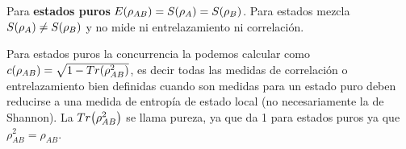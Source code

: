 Para \textbf{estados puros} $E\PARENTESIS{\rho_{AB}}=S\PARENTESIS{\rho_{A}}=S\PARENTESIS{\rho_{B}}$.
Para estados mezcla $S\PARENTESIS{\rho_{A}}\neq S\PARENTESIS{\rho_{B}}$
y no mide ni entrelazamiento ni correlación. 

Para estados puros la concurrencia la podemos calcular como $c\PARENTESIS{\rho_{AB}}=\sqrt{1-Tr\PARENTESIS{\rho_{AB}^{2}}}$,
es decir todas las medidas de correlación o entrelazamiento bien definidas
cuando son medidas para un estado puro deben reducirse a una medida
de entropía de estado local (no necesariamente la de Shannon). La
$Tr\PARENTESIS{\rho_{AB}^{2}}$ se llama pureza, ya que da 1 para
estados puros ya que $\rho_{AB}^{2}=\rho_{AB}$.




